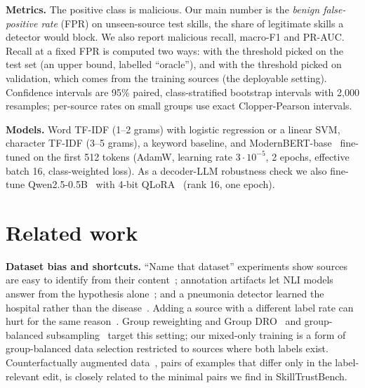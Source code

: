 \documentclass[conference]{IEEEtran}
\begin{document}
\textbf{Metrics.} The positive class is malicious. Our main number is the \emph{benign false-positive rate}
(FPR) on unseen-source test skills, the share of legitimate skills a detector would block. We also report
malicious recall, macro-F1 and PR-AUC. Recall at a fixed FPR is computed two ways: with the threshold picked
on the test set (an upper bound, labelled ``oracle''), and with the threshold picked on validation, which
comes from the training sources (the deployable setting). Confidence intervals are 95\% paired,
class-stratified bootstrap intervals with 2,000 resamples; per-source rates on small groups use exact
Clopper-Pearson intervals.

\textbf{Models.} Word TF-IDF (1--2 grams) with logistic regression or a linear SVM, character TF-IDF (3--5
grams), a keyword baseline, and ModernBERT-base~\cite{modernbert2024} fine-tuned on the first 512 tokens
(AdamW, learning rate $3\cdot10^{-5}$, 2 epochs, effective batch 16, class-weighted loss). As a
decoder-LLM robustness check we also fine-tune Qwen2.5-0.5B~\cite{qwen25} with 4-bit
QLoRA~\cite{dettmers2023} (rank 16, one epoch).





\section{Related work}
\textbf{Dataset bias and shortcuts.} ``Name that dataset'' experiments show sources are easy to identify from
their content~\cite{torralba2011,liu2025decade}; annotation artifacts let NLI models answer from the hypothesis
alone~\cite{gururangan2018}; and a pneumonia detector learned the hospital rather than the
disease~\cite{zech2018}. Adding a source with a different label rate can hurt for the same
reason~\cite{compton2023}. Group reweighting and Group DRO~\cite{sagawa2020} and group-balanced
subsampling~\cite{idrissi2022} target this setting; our mixed-only training is a form of group-balanced data
selection restricted to sources where both labels exist. Counterfactually augmented data~\cite{kaushik2020},
pairs of examples that differ only in the label-relevant edit, is closely related to the minimal pairs we
find in SkillTrustBench.
\end{document}
